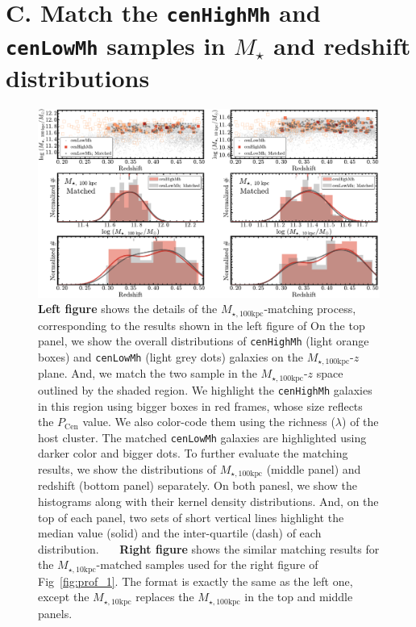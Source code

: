 \documentclass[a4paper,fleqn,usenatbib]{mnras}
\def\rbcg{\texttt{cenHighMh}}
\def\nbcg{\texttt{cenLowMh}}
\def\mstar{{$M_{\star}$}}
\def\minn{{$M_{\star,10\mathrm{kpc}}$}}
\def\mtot{{$M_{\star,100\mathrm{kpc}}$}}
\begin{document}

\section{C. Match the \rbcg{} and \nbcg{} samples in \mstar{} and redshift distributions}
    \label{app:match}

\begin{figure}
    \centering 
    \includegraphics[width=\textwidth]{fig/redbcg_match}
    \caption{
        \textbf{Left figure} shows the details of the \mtot{}-matching process, 
        corresponding to the results shown in the left figure of   
        On the top panel, we show the overall distributions of \rbcg{} (light orange boxes) 
        and \nbcg{} (light grey dots) galaxies on the \mtot{}-$z$ plane.  
        And, we match the two sample in the \mtot{}-$z$ space outlined by the shaded region.
        We highlight the \rbcg{} galaxies in this region using bigger boxes in red frames, 
        whose size reflects the $P_{\mathrm{Cen}}$ value.  
        We also color-code them using the richness ($\lambda$) of the host cluster. 
        The matched \nbcg{} galaxies are highlighted using darker color and bigger dots. 
        To further evaluate the matching results, we show the distributions of \mtot{} 
        (middle panel) and redshift (bottom panel) separately. 
        On both panesl, we show the histograms along with their kernel density 
        distributions.  
        And, on the top of each panel, two sets of short vertical lines highlight the median 
        value (solid) and the inter-quartile (dash) of each distribution.~~~
        \textbf{Right figure} shows the similar matching results for the \minn{}-matched
        samples used for the right figure of Fig~\ref{fig:prof_1}.
        The format is exactly the same as the left one, except the \minn{} replaces the 
        \mtot{} in the top and middle panels.}
    \label{fig:match}
\end{figure}
    
\end{document}
